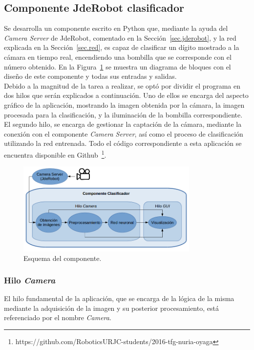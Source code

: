 \subsection{Componente JdeRobot clasificador} \label{sec.componente}
Se desarrolla un componente escrito en Python que, mediante la ayuda del \textit{Camera Server} de JdeRobot, comentado en la Sección~\ref{sec.jderobot},  y la red explicada en la Sección~\ref{sec.red}, es capaz de clasificar un dígito mostrado a la cámara en tiempo real, encendiendo una bombilla que se corresponde con el número obtenido. En la Figura~\ref{fig.componente} se muestra un diagrama de bloques con el diseño de este componente y todas sus entradas y salidas.\\
	
Debido a la magnitud de la tarea a realizar, se optó por dividir el programa en dos hilos que serán explicados a continuación. Uno de ellos se encarga del aspecto gráfico de la aplicación, mostrando la imagen obtenida por la cámara, la imagen procesada para la clasificación, y la iluminación de la bombilla correspondiente. El segundo hilo, se encarga de gestionar la captación de la cámara, mediante la conexión con el componente \textit{Camera Server}, así como el proceso de clasificación utilizando la red entrenada. Todo el código correspondiente a esta aplicación se encuentra disponible en Github~\footnote{https://github.com/RoboticsURJC-students/2016-tfg-nuria-oyaga}.

\begin{figure}[H]
	\centering
	\includegraphics[width=0.8\textwidth]{figures/esquemaComponente}
	\caption{Esquema del componente.}
	\label{fig.componente}
\end{figure}

\subsubsection{Hilo \textit{Camera}} \label{sec.camara}
El hilo fundamental de la aplicación, que se encarga de la lógica de la misma mediante la adquisición de la imagen y su posterior procesamiento, está referenciado por el nombre \textit{Camera}.\\

